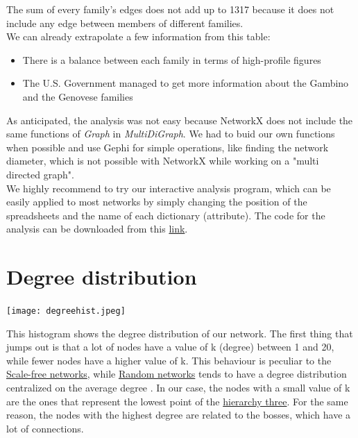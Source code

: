 \documentclass{article}
\begin{document}
\noindent
The sum of every family's edges does not add up to 1317 because it does not include any edge between members of different families.\\
We can already extrapolate a few information from this table:
\begin{itemize}
    \item There is a balance between each family in terms of high-profile figures
    \item The U.S. Government managed to get more information about the Gambino and the Genovese families
\end{itemize}
As anticipated, the analysis was not easy because NetworkX does not include the same functions of \textit{Graph} in \textit{MultiDiGraph}. We had to buid our own functions when possible and use Gephi for simple operations, like finding the network diameter, which is not possible with NetworkX while working on a "multi directed graph".\\
We highly recommend to try our interactive analysis program, which can be easily applied to most networks by simply changing the position of the spreadsheets and the name of each dictionary (attribute). The code for the analysis can be downloaded from this \href{https://github.com/TizianoIannaccio/Network-Analytics}{link}.\\
\vspace{-10pt}



\section{\textcolor{Paragrafi}{Degree distribution}}



\noindent\begin{minipage}{0.5\textwidth}
\advance\leftskip-3.3cm
\texttt{[image: degreehist.jpeg]}
\end{minipage}%
\hfill%
\begin{minipage}{0.6\textwidth}\raggedleft
This histogram shows the degree distribution of our network. The first thing that jumps out is that a lot of nodes have a value of k (degree) between 1 and 20, while fewer nodes have a higher value of k. This behaviour is peculiar to the \href{https://en.wikipedia.org/wiki/Scale-free_network}{Scale-free networks}, while \href{https://en.wikipedia.org/wiki/Random_graph}{Random networks} tends to have a degree distribution centralized on the average degree . In our case, the nodes with a small value of k are the ones that represent the lowest point of the \hyperlink{Hierarchy}{hierarchy three}. For the same reason, the nodes with the highest degree are related to the bosses, which have a lot of connections. 
\end{minipage}
\newpage
\end{document}

